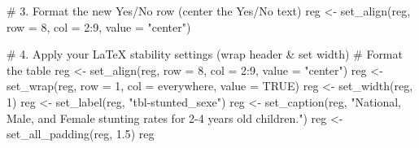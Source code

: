 \documentclass[
  letterpaper,
  DIV=11,
  numbers=noendperiod]{scrartcl}
\newenvironment{Shaded}{\begin{snugshade}}{\end{snugshade}}
\newcommand{\AttributeTok}[1]{\textcolor[rgb]{0.40,0.45,0.13}{#1}}
\newcommand{\CommentTok}[1]{\textcolor[rgb]{0.37,0.37,0.37}{#1}}
\newcommand{\ConstantTok}[1]{\textcolor[rgb]{0.56,0.35,0.01}{#1}}
\newcommand{\DecValTok}[1]{\textcolor[rgb]{0.68,0.00,0.00}{#1}}
\newcommand{\FloatTok}[1]{\textcolor[rgb]{0.68,0.00,0.00}{#1}}
\newcommand{\FunctionTok}[1]{\textcolor[rgb]{0.28,0.35,0.67}{#1}}
\newcommand{\NormalTok}[1]{\textcolor[rgb]{0.00,0.23,0.31}{#1}}
\newcommand{\OtherTok}[1]{\textcolor[rgb]{0.00,0.23,0.31}{#1}}
\newcommand{\SpecialCharTok}[1]{\textcolor[rgb]{0.37,0.37,0.37}{#1}}
\newcommand{\StringTok}[1]{\textcolor[rgb]{0.13,0.47,0.30}{#1}}
\begin{document}
\begin{Shaded}
\begin{Highlighting}[]
\CommentTok{\# 3. Format the new Yes/No row (center the Yes/No text)}
\NormalTok{reg }\OtherTok{\textless{}{-}} \FunctionTok{set\_align}\NormalTok{(reg, }\AttributeTok{row =} \DecValTok{8}\NormalTok{, }\AttributeTok{col =} \DecValTok{2}\SpecialCharTok{:}\DecValTok{9}\NormalTok{, }\AttributeTok{value =} \StringTok{"center"}\NormalTok{)}

\CommentTok{\# 4. Apply your LaTeX stability settings (wrap header \& set width)}
\CommentTok{\# Format the table}
\NormalTok{reg }\OtherTok{\textless{}{-}} \FunctionTok{set\_align}\NormalTok{(reg, }\AttributeTok{row =} \DecValTok{8}\NormalTok{, }\AttributeTok{col =} \DecValTok{2}\SpecialCharTok{:}\DecValTok{9}\NormalTok{, }\AttributeTok{value =} \StringTok{"center"}\NormalTok{)}
\NormalTok{reg }\OtherTok{\textless{}{-}} \FunctionTok{set\_wrap}\NormalTok{(reg, }\AttributeTok{row =} \DecValTok{1}\NormalTok{, }\AttributeTok{col =}\NormalTok{ everywhere, }\AttributeTok{value =} \ConstantTok{TRUE}\NormalTok{)}
\NormalTok{reg }\OtherTok{\textless{}{-}} \FunctionTok{set\_width}\NormalTok{(reg, }\DecValTok{1}\NormalTok{)}
\NormalTok{reg }\OtherTok{\textless{}{-}} \FunctionTok{set\_label}\NormalTok{(reg, }\StringTok{"tbl{-}stunted\_sexe"}\NormalTok{)}
\NormalTok{reg }\OtherTok{\textless{}{-}} \FunctionTok{set\_caption}\NormalTok{(reg, }\StringTok{"National, Male, and Female stunting rates for 2{-}4 years old children."}\NormalTok{) }
\NormalTok{reg }\OtherTok{\textless{}{-}} \FunctionTok{set\_all\_padding}\NormalTok{(reg, }\FloatTok{1.5}\NormalTok{)}
\NormalTok{reg}
\end{Highlighting}
\end{Shaded}
\end{document}
